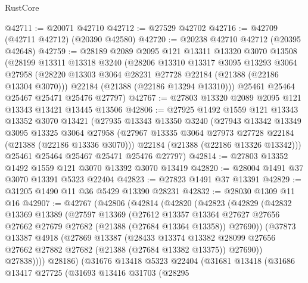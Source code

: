 \begin{lexlean}{RustCore}
\begin{coremodule}
@42711 := @20071 @42710
@42712 := @27529 @42702
@42716 := @42709 (@42711 @42712) (@20390 @42580)
@42720 := @20238 @42710 @42712 (@20395 @42648)
@42759 := @28189
    @2089
    @2095
    @121
    @13311
    @13320
    @3070
    @13508
    (@28199
      @13311
      @13318
      @3240
      (@28206
        @13310
        @13317
        @3095
        @13293
        @3064
        @27958
        (@28220 @13303 @3064 @28231 @27728 @22184 (@21388 (@22186 @13304 @3070)))
        @22184
        (@21388 (@22186 @13294 @13310)))
      @25461
      @25464
      @25467
      @25471
      @25476
      @27797)
@42767 := @27803 @13320 @2089 @2095 @121 @13343 @13421 @13445 @13506
@42806 := @27925
    @1492
    @1559
    @121
    @13343
    @13352
    @3070
    @13421
    (@27935
      @13343
      @13350
      @3240
      (@27943
        @13342
        @13349
        @3095
        @13325
        @3064
        @27958
        (@27967 @13335 @3064 @27973 @27728 @22184 (@21388 (@22186 @13336 @3070)))
        @22184
        (@21388 (@22186 @13326 @13342)))
      @25461
      @25464
      @25467
      @25471
      @25476
      @27797)
@42814 := @27803 @13352 @1492 @1559 @121 @3070 @13392 @3070 @13419
@42820 := @28004 @1491 @37 @3070 @13391 @5323 @22404
@42823 := @27823 @1491 @37 @13391
@42829 := @31205 @1490 @11 @36 @5429 @13390 @28231
@42832 := @28030 @1309 @11 @16
@42907 := @42767
    (@42806
      (@42814
        (@42820
          (@42823
            (@42829
              (@42832
                @13369
                @13389
                (@27597
                  @13369
                  (@27612
                    @13357
                    @13364
                    @27627
                    @27656
                    @27662
                    @27679
                    @27682
                    (@21388 (@27684 @13364 @13358))
                    @27690))
                (@37873
                  @13387
                  @4918
                  (@27869
                    @13387
                    (@28433
                      @13374
                      @13382
                      @28099
                      @27656
                      @27662
                      @27882
                      @27682
                      (@21388 (@27684 @13382 @13375))
                      @27690))
                  @27838))))
          @28186)
        (@31676
          @13418
          @5323
          @22404
          (@31681
            @13418
            (@31686
              @13417
              @27725
              (@31693
                @13416
                @31703
                (@28295

\end{coremodule}
\end{lexlean}
